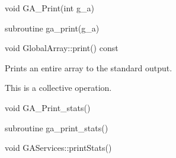 \documentclass[12pt]{article}
\begin{document}

\begin{capi}
\begin{ccode}
void GA_Print(int g_a)
\end{ccode}
\begin{funcargs}
\end{funcargs}
\end{capi}

\begin{fapi}
\begin{fcode}
subroutine ga_print(g_a)
\end{fcode}
\begin{funcargs}
\end{funcargs}
\end{fapi}

\begin{cxxapi}
\begin{cxxcode}
void GlobalArray::print() const
\end{cxxcode}
\end{cxxapi}


\gcoll

\begin{desc}

Prints an entire array to the standard output.

This is a collective operation.
\end{desc}


\begin{capi}
\begin{ccode}
void GA_Print_stats()
\end{ccode}
\end{capi}

\begin{fapi}
\begin{fcode}
subroutine ga_print_stats()
\end{fcode}
\end{fapi}

\begin{cxxapi}
\begin{cxxcode}
void GAServices::printStats()
\end{cxxcode}
\end{cxxapi}
\end{document}
